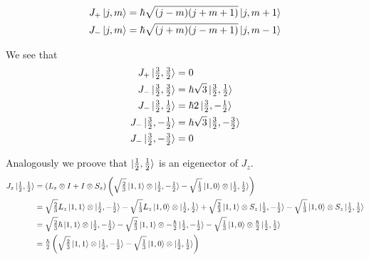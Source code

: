\documentclass[a4paper,german,12pt,smallheadings]{scrartcl}
\begin{document}
\begin{enumerate}[a)]
    \begin{align*}
      J_+ \ket{j, m} &= \hbar \sqrt{(j-m)(j+m+1)} \ket{j, m+1} \\
      J_- \ket{j, m} &= \hbar \sqrt{(j+m)(j-m+1)} \ket{j, m-1} \\
    \end{align*}

    We see that
    \begin{align*}
      J_+ \ket{\tfrac{3}{2}, \tfrac{3}{2}} &= 0 \\
      J_- \ket{\tfrac{3}{2}, \tfrac{3}{2}} &= \hbar \sqrt{3} \ket{\tfrac{3}{2}, \tfrac{1}{2}} \\
      J_- \ket{\tfrac{3}{2}, \tfrac{1}{2}} &= \hbar 2 \ket{\tfrac{3}{2}, -\tfrac{1}{2}} \\
      J_- \ket{\tfrac{3}{2}, -\tfrac{1}{2}} &= \hbar \sqrt{3} \ket{\tfrac{3}{2}, -\tfrac{3}{2}} \\
      J_- \ket{\tfrac{3}{2}, -\tfrac{3}{2}} &= 0
    \end{align*}

    Analogously we proove that $\ket{\tfrac{1}{2}, \tfrac{1}{2}}$ is an
    eigenector of $J_z$.
    \begin{align*}
      J_z \ket{\tfrac{1}{2}, \tfrac{1}{2}} 
      &= (L_z \otimes I + I \otimes S_z) \del{
        \sqrt{\tfrac{2}{3}}\ket{1,1} \otimes \ket{\tfrac{1}{2}, -\tfrac{1}{2}} -
        \sqrt{\tfrac{1}{3}}\ket{1,0} \otimes \ket{\tfrac{1}{2}, \tfrac{1}{2}}
      }\\
      &=
        \sqrt{\tfrac{2}{3}}L_z\ket{1,1} \otimes \ket{\tfrac{1}{2}, -\tfrac{1}{2}} -
        \sqrt{\tfrac{1}{3}}L_z\ket{1,0} \otimes \ket{\tfrac{1}{2}, \tfrac{1}{2}} +
        \sqrt{\tfrac{2}{3}}\ket{1,1} \otimes S_z\ket{\tfrac{1}{2}, -\tfrac{1}{2}} -
        \sqrt{\tfrac{1}{3}}\ket{1,0} \otimes S_z\ket{\tfrac{1}{2}, \tfrac{1}{2}} \\
      &=
        \sqrt{\tfrac{2}{3}} \hbar \ket{1,1} \otimes \ket{\tfrac{1}{2}, -\tfrac{1}{2}} -
        \sqrt{\tfrac{2}{3}}\ket{1,1} \otimes -\tfrac{\hbar}{2} \ket{\tfrac{1}{2}, -\tfrac{1}{2}} -
        \sqrt{\tfrac{1}{3}}\ket{1,0} \otimes \tfrac{\hbar}{2} \ket{\tfrac{1}{2}, \tfrac{1}{2}} \\
      &= \tfrac{\hbar}{2} \del{
        \sqrt{\tfrac{2}{3}}\ket{1,1} \otimes \ket{\tfrac{1}{2}, -\tfrac{1}{2}} -
        \sqrt{\tfrac{1}{3}}\ket{1,0} \otimes \ket{\tfrac{1}{2}, \tfrac{1}{2}}
      }\\
    \end{align*}


\end{enumerate}
\end{document}
